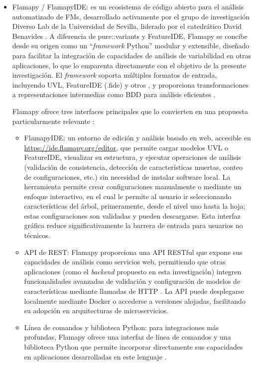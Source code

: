 \begin{itemize}
    \item Flamapy / FlamapyIDE: es un ecosistema de código abierto para el análisis 
    automatizado de \ac{FM}s, desarrollado activamente por el grupo de investigación 
    Diverso Lab de la Universidad de Sevilla, liderado por el catedrático David Benavides 
    \citep{galindo2023flama}. A diferencia de pure::variants y FeatureIDE, Flamapy se 
    concibe desde su origen como un ``\textit{framework} Python'' modular y extensible, diseñado 
    para facilitar la integración de capacidades de análisis de variabilidad en otras 
    aplicaciones, lo que lo emparenta directamente con el objetivo de la presente 
    investigación. El \textit{framework} soporta múltiples formatos de entrada, incluyendo \ac{UVL}, 
    FeatureIDE (.fide) y otros \citep{flamapyfeatureidereader2025}, y proporciona 
    transformaciones a representaciones intermedias como \ac{BDD} para análisis eficientes \citep{flamapyfm2bdd2025}.
    
    
    Flamapy ofrece tres interfaces principales que lo convierten en una propuesta particularmente relevante \citep{flamapyrest2024}:
    \begin{itemize}
        \item FlamapyIDE: un entorno de edición y análisis basado en web, accesible
        en \url{https://ide.flamapy.org/editor}, que permite cargar modelos \ac{UVL} o 
        FeatureIDE, visualizar su estructura, y ejecutar operaciones de análisis 
        (validación de consistencia, detección de características muertas, conteo de 
        configuraciones, etc.) sin necesidad de instalar software local. La herramienta permite
        crear configuraciones manualmente o mediante un enfoque interactivo, en el cual le permite al usuario
        ir seleccionando características del árbol, primeramente, desde el nivel uno hasta la hoja; 
        estas configuraciones son validadas y pueden descargarse. Esta interfaz 
        gráfica reduce significativamente la barrera de entrada para usuarios no técnicos.
        
        \item \ac{API} de \ac{REST}: Flamapy proporciona una \ac{API} RESTful que expone sus 
        capacidades de análisis como servicios web, permitiendo que otras aplicaciones 
        (como el \textit{backend} propuesto en esta investigación) integren funcionalidades avanzadas 
        de validación y configuración de modelos de características mediante llamadas de \ac{HTTP} 
        \citep{flamapyrest2024}. La \ac{API} puede desplegarse localmente mediante Docker o 
        accederse a versiones alojadas, facilitando su adopción en arquitecturas de 
        microservicios.
        
        \item Línea de comandos y biblioteca Python: para integraciones más 
        profundas, Flamapy ofrece una interfaz de línea de comandos y una biblioteca 
        Python que permite incorporar directamente sus capacidades en aplicaciones 
        desarrolladas en este lenguaje \citep{flamapydocs2025}.
    \end{itemize}
    
\end{itemize}

